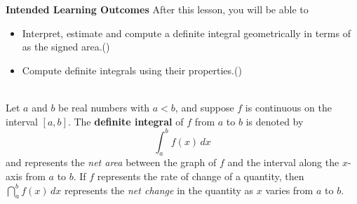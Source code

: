 \documentclass[10pt]{article}
\begin{document}
\pagestyle{otherpages}
\thispagestyle{firstpage}

\textbf{Intended Learning Outcomes}
After this lesson, you will be able to 

\begin{itemize}
    \item Interpret, estimate and compute a definite integral geometrically in terms of as the signed area.()
    \item Compute definite integrals using their properties.()
\end{itemize}

\vspace{-0.6cm}

\hrulefill\\
{
Let $a$ and $b$ be real numbers with $a<b$, and suppose $f$ is continuous on the interval $[a,b]$. The {\bf definite integral} of $f$ from $a$ to $b$ is denoted by \[\int_a^b f(x)\,dx\] and represents the {\it net area} between the graph of $f$ and the interval along the $x$-axis from $a$ to $b$. If $f$ represents the rate of change of a quantity, then $\dint_a^b f(x)\,dx$ represents the {\it net change} in the quantity as $x$ varies from $a$ to $b$.
}
\end{document}
